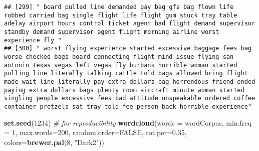 \documentclass[
]{article}
\newenvironment{Shaded}{\begin{snugshade}}{\end{snugshade}}
\newcommand{\AttributeTok}[1]{\textcolor[rgb]{0.13,0.29,0.53}{#1}}
\newcommand{\CommentTok}[1]{\textcolor[rgb]{0.56,0.35,0.01}{\textit{#1}}}
\newcommand{\ConstantTok}[1]{\textcolor[rgb]{0.56,0.35,0.01}{#1}}
\newcommand{\DecValTok}[1]{\textcolor[rgb]{0.00,0.00,0.81}{#1}}
\newcommand{\FloatTok}[1]{\textcolor[rgb]{0.00,0.00,0.81}{#1}}
\newcommand{\FunctionTok}[1]{\textcolor[rgb]{0.13,0.29,0.53}{\textbf{#1}}}
\newcommand{\NormalTok}[1]{#1}
\newcommand{\StringTok}[1]{\textcolor[rgb]{0.31,0.60,0.02}{#1}}
\begin{document}
\begin{verbatim}
## [299] " board pulled line demanded pay bag gfs bag flown life robbed carried bag single flight life flight gum stuck tray table adelay airport hours control ticket agent bad flight demand supervisor standby demand supervisor agent flight morning airline worst experience fly "                                                                                                                                                                                                                                                                                                                                                                                                                                                                                                                                                                                                                                                                                                                                                                                                                                                                                                                                                                                                                                                                                                                                                                                                                                                                                                                                                                                                                                                                                                                  
## [300] " worst flying experience started excessive baggage fees bag worse checked bags board connecting flight mind issue flying san antonio texas vegas left vegas fly burbank horrible woman started pulling line literally talking cattle told bags allowed bring flight made wait line literally pay extra dollars bag horrendous friend ended paying extra dollars bags plenty room aircraft minute woman started singling people excessive fees bad attitude unspeakable ordered coffee container pretzels sat tray told fee person back horrible experience"
\end{verbatim}

\begin{Shaded}
\begin{Highlighting}[]
\FunctionTok{set.seed}\NormalTok{(}\DecValTok{1234}\NormalTok{) }\CommentTok{\# for reproducibility}
\FunctionTok{wordcloud}\NormalTok{(}\AttributeTok{words =}\NormalTok{ wordCorpus, }\AttributeTok{min.freq =} \DecValTok{1}\NormalTok{,}
          \AttributeTok{max.words=}\DecValTok{200}\NormalTok{, }\AttributeTok{random.order=}\ConstantTok{FALSE}\NormalTok{, }\AttributeTok{rot.per=}\FloatTok{0.35}\NormalTok{,}
          \AttributeTok{colors=}\FunctionTok{brewer.pal}\NormalTok{(}\DecValTok{8}\NormalTok{, }\StringTok{"Dark2"}\NormalTok{))}
\end{Highlighting}
\end{Shaded}
\end{document}
